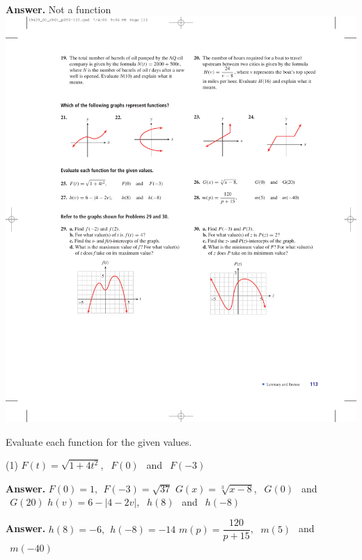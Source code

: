 \documentclass[10pt,]{book}
\theoremstyle{plain}
\theoremstyle{definition}
\theoremstyle{definition}
\theoremstyle{definition}
\theoremstyle{definition}
\numberwithin{equation}{part}
\newcommand\abs[1]{\left|#1\right|}
\begin{document}
\begin{exerciselist}
\begin{exercisegroup}
%
\par\smallskip
\noindent\textbf{Answer.}\hypertarget{answer-233}{}\quad
Not a function%
\exercise[24.]\hypertarget{exercise-420}{}\includegraphics[width=0.9\linewidth]{images/fig-chap1-rev-24}
%
\end{exercisegroup}
\par\smallskip\noindent
\hypertarget{exercisegroup-55}{}\par\noindent Evaluate each function for the given values.%
\begin{exercisegroup}(1)
\exercise[25.]\hypertarget{exercise-421}{}\(F(t)=\sqrt{1+4t^2}\), \(~~F(0)~~\) and \(~~F(-3)\)%
\par\smallskip
\noindent\textbf{Answer.}\hypertarget{answer-234}{}\quad
\(F(0) = 1, ~~F(-3) =\sqrt{37}\)%
\exercise[26.]\hypertarget{exercise-422}{}\(G(x)=\sqrt[3]{x-8}\), \(~~G(0)~~\) and \(~~G(20)\)%
\exercise[27.]\hypertarget{exercise-423}{}\(h(v)=6-\abs{4-2v} \), \(~~h(8)~~\) and \(~~h(-8)\)%
\par\smallskip
\noindent\textbf{Answer.}\hypertarget{answer-235}{}\quad
\(h(8) = -6, ~~h(-8) = -14\)%
\exercise[28.]\hypertarget{exercise-424}{}\(m(p)=\dfrac{120}{p+15} \), \(~~m(5)~~\) and \(~~m(-40)\)%
\end{exercisegroup}
\par\smallskip\noindent

\end{exerciselist}
\end{document}
